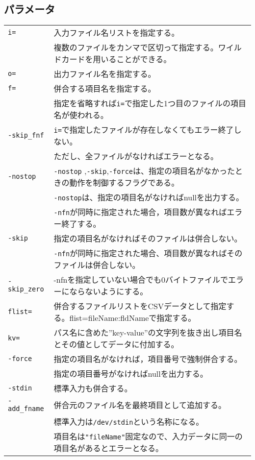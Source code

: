 \subsection*{パラメータ}
\begin{table}[htbp]
{\small
\begin{tabular}{ll}
\verb|i=|        & 入力ファイル名リストを指定する。\\
                 & 複数のファイルをカンマで区切って指定する。ワイルドカードを用いることができる。\\
\verb|o=|  			 & 出力ファイル名を指定する。\\
\verb|f=|        & 併合する項目名を指定する。\\
                 & 指定を省略すれば\verb|i=|で指定した1つ目のファイルの項目名が使われる。\\
\verb|-skip_fnf| & \verb|i=|で指定したファイルが存在しなくてもエラー終了しない。\\
                 & ただし、全ファイルがなければエラーとなる。\\
\verb|-nostop|   & \verb|-nostop| ,\verb|-skip|,\verb|-force|は、指定の項目名がなかったときの動作を制御するフラグである。\\
                 & \verb|-nostop|は、指定の項目名がなければnullを出力する。\\
                 & \verb|-nfn|が同時に指定された場合，項目数が異なればエラー終了する。\\
\verb|-skip|     & 指定の項目名がなければそのファイルは併合しない。\\
                 & \verb|-nfn|が同時に指定された場合、項目数が異なればそのファイルは併合しない。\\
\verb|-skip_zero|	& -nfnを指定していない場合でも0バイトファイルでエラーにならないようにする。 \\
\verb|flist=|		 & 併合するファイルリストをCSVデータとして指定する。flist=fileName:fldNameで指定する。\\
\verb|kv=|			 & パス名に含めた”key-value”の文字列を抜き出し項目名とその値としてデータに付加する。\\
\verb|-force|    & 指定の項目名がなければ，項目番号で強制併合する。\\
                 & 指定の項目番号がなければnullを出力する。\\
\verb|-stdin|    & 標準入力も併合する。\\
\verb|-add_fname|& 併合元のファイル名を最終項目として追加する。\\
                 & 標準入力は\verb|/dev/stdin|という名称になる。\\
                 & 項目名は\verb|"fileName"|固定なので、入力データに同一の項目名があるとエラーとなる。\\
\end{tabular}
}
\end{table}

